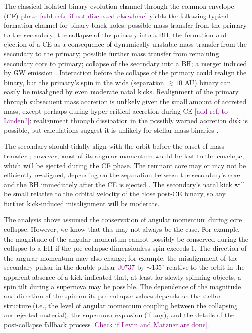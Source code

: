\documentclass[modern]{aastex61}
\newcommand{\ilya}[1]{\textcolor{purple}{#1}}
\begin{document}
The classical isolated binary evolution channel through the common-envelope (CE) phase \ilya{[add refs. if not discussed elsewhere]} yields the following typical formation channel for binary black holes: possible mass transfer from the primary to the secondary; the collapse of the primary into a BH; the formation and ejection of a CE as a consequence of dynamically unstable mass transfer from the secondary to the primary; possible further mass transfer from remaining secondary core to primary; collapse of the secondary into a BH; a merger induced by GW emission \citep[e.g.,][]{Belczynski:2016,Stevenson:2017}.  Interaction before the collapse of the primary could realign the binary, but the primary’s spin in the wide (separation $\gtrsim 10$ AU) binary can easily be misaligned by even moderate \citep{Mandel:2015kicks} natal kicks.  Realignment of the primary through subsequent mass accretion is unlikely given the small amount of accreted mass, except perhaps during hyper-critical accretion during CE \ilya{[add ref. to Linden?]}; realignment through dissipation in the possibly warped accretion disk \citep{BardeenPatterson} is possible, but calculations suggest it is unlikely for stellar-mass binaries \citep{KLOP}.  

The secondary should tidally align with the orbit before the onset of mass transfer \citep[e.g.,][]{Kalogera:2000,Gerosa:2013}; however, most of its angular momentum would be lost to the envelope, which will be ejected during the CE phase.  The remnant core may or may not be efficiently re-aligned, depending on the separation between the secondary’s core and the BH immediately after the CE is ejected \citep{Kushnir:2017}.  The secondary’s natal kick will be small relative to the orbital velocity of the close post-CE binary, so any further kick-induced misalignment will be moderate.

The analysis above assumed the conservation of angular momentum during core collapse. However, we know that this may not always be the case.  For example, the magnitude of the angular momentum cannot possibly be conserved during the collapse to a BH if the pre-collapse dimensionless spin exceeds $1$.  The direction of the angular momentum may also change; for example, the misalignment of the secondary pulsar in the double pulsar \ilya{J0737} by $\sim 135^{\circ}$ relative to the orbit in the apparent absence of a kick indicated that, at least for slowly spinning objects, a spin tilt during a supernova may be possible.  The dependence of the magnitude and direction of the spin on its pre-collapse values depends on the stellar structure (i.e., the level of angular momentum coupling between the collapsing and ejected material), the supernova explosion (if any), and the details of the post-collapse fallback process \ilya{[Check if Levin and Matzner are done]}.
\end{document}
